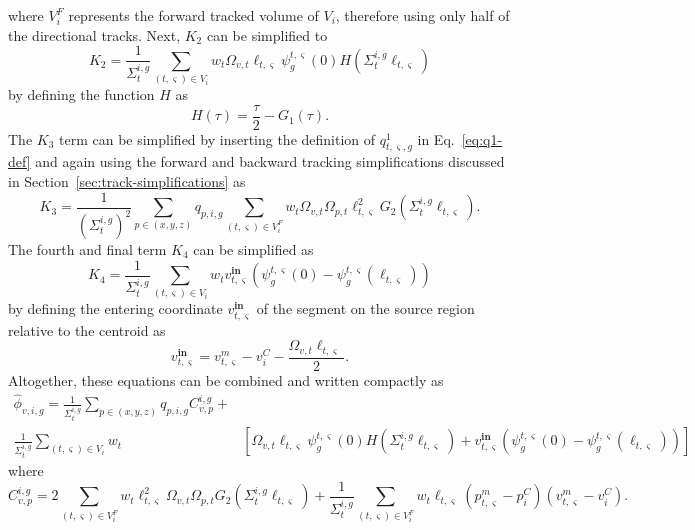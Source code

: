 where $V^F_i$ represents the forward tracked volume of $V_i$, therefore using only half of the directional tracks. Next, $K_2$ can be simplified to
\begin{equation}
K_2 = \frac{1}{\Sigma_{t}^{i,g}} \sum_{(t,\varsigma) \in V_i} w_t \Omega_{v,t} \ell_{t,\varsigma} \psi^{t,\varsigma}_g(0) H(\Sigma_{t}^{i,g} \ell_{t,\varsigma})
\end{equation}
by defining the function $H$ as
\begin{equation}
H(\tau) = \frac{\tau}{2} - G_1(\tau).
\label{eq:h}
\end{equation}
The $K_3$ term can be simplified by inserting the definition of $q^1_{t,\varsigma,g}$ in Eq.~\ref{eq:q1-def} and again using the forward and backward tracking simplifications discussed in Section~\ref{sec:track-simplifications} as
\begin{equation}
K_3 = \frac{1}{\left(\Sigma_{t}^{i,g}\right)^2} \sum_{p \in (x,y,z)} q_{p,i,g} \sum_{(t,\varsigma) \in V^F_i} w_t \Omega_{v,t} \Omega_{p,t} \ell_{t,\varsigma}^2 G_2(\Sigma_{t}^{i,g} \ell_{t,\varsigma}).
\end{equation}
The fourth and final term $K_4$ can be simplified as
\begin{equation}
K_4 = \frac{1}{\Sigma_{t}^{i,g}} \sum_{(t,\varsigma) \in V_i} w_t v^{\textbf{in}}_{t,\varsigma} \left(\psi^{t,\varsigma}_g(0) - \psi^{t,\varsigma}_g(\ell_{t,\varsigma}) \right)
\end{equation}
by defining the entering coordinate $v^{\textbf{in}}_{t,\varsigma}$ of the segment on the source region relative to the centroid as
\begin{equation}
v^{\textbf{in}}_{t,\varsigma} = v^m_{t,\varsigma} - v^C_i - \frac{\Omega_{v,t} \ell_{t,\varsigma}}{2}.
\end{equation}
Altogether, these equations can be combined and written compactly as
\begin{equation}
\begin{split}
\hat{\phi}_{v,i,g} = \frac{1}{\Sigma_{t}^{i,g}} \sum_{p \in (x,y,z)} q_{p,i,g} C_{v,p}^{i,g} + & \\
\frac{1}{\Sigma_{t}^{i,g}} \sum_{(t,\varsigma) \in V_i} w_t & \left[\Omega_{v,t} \ell_{t,\varsigma} \psi^{t,\varsigma}_g(0) H(\Sigma_{t}^{i,g} \ell_{t,\varsigma}) + v^{\textbf{in}}_{t,\varsigma} \left(\psi^{t,\varsigma}_g(0) - \psi^{t,\varsigma}_g(\ell_{t,\varsigma}) \right)\right]
\end{split}
\label{eq:final-scalar-flux-moments}
\end{equation}
where
\begin{equation}
C_{v,p}^{i,g} =  2 \sum_{(t,\varsigma) \in V^F_i} w_t \ell_{t,\varsigma}^2 \Omega_{v,t} \Omega_{p,t} G_2(\Sigma_{t}^{i,g} \ell_{t,\varsigma}) + \frac{1}{\Sigma_{t}^{i,g}} \sum_{(t,\varsigma) \in V^F_i} w_t \ell_{t,\varsigma} \left( p^m_{t,\varsigma} - p^C_i \right) \left(v^m_{t,\varsigma} - v^C_i\right).
\label{eq:ls-C}
\end{equation}

